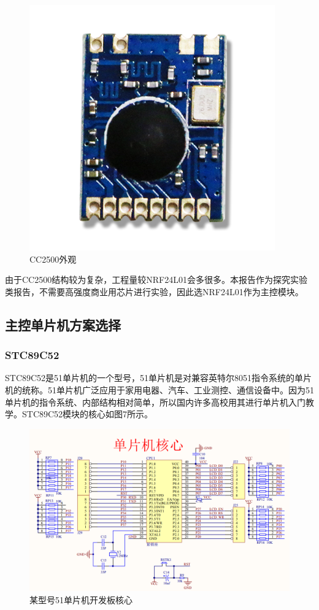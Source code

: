 \documentclass[UTF8,a4paper,11pt]{article}
\begin{document}
\begin{figure}[htbp]
    \centering
    \includegraphics[scale=0.8]{p5.png}
    \caption{CC2500外观}
\end{figure} 

由于CC2500结构较为复杂，工程量较NRF24L01会多很多。本报告作为探究实验类报告，不需要高强度商业用芯片进行实验，因此选NRF24L01作为主控模块。

\subsection{主控单片机方案选择}
\subsubsection{STC89C52}
STC89C52是51单片机的一个型号，51单片机是对兼容英特尔8051指令系统的单片机的统称。51单片机广泛应用于家用电器、汽车、工业测控、通信设备中。因为51单片机的指令系统、内部结构相对简单，所以国内许多高校用其进行单片机入门教学。STC89C52模块的核心如图7所示。

\begin{figure}[htbp]
    \centering
    \includegraphics[scale=0.6]{p6.png}
    \caption{某型号51单片机开发板核心}
\end{figure} 
\end{document}

